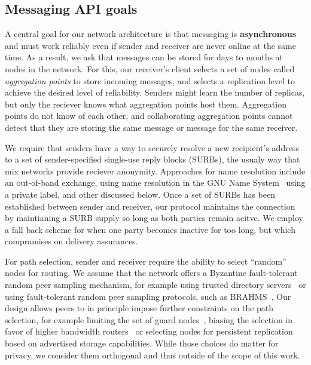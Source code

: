 \subsection{Messaging API goals} 

A central goal for our network architecture is that messaging is 
{\bf asynchronous} and must work reliably even if sender and receiver
are never online at the same time.  As a result, we ask that messages
can be stored for days to months at nodes in the network.  For this,
our receiver's client selects a set of nodes called {\em aggregation
points} to store incoming messages, and selects a replication level
to achieve the desired level of reliability.  Senders might learn the
number of replicas, but only the reciever knows what aggregation
points host them.  Aggregation points do not know of each other, and
collaborating aggregation points cannot detect that they are storing
the same message or message for the same receiver.

We require that senders have a way to securely resolve a new
recipient's address to a set of sender-specified single-use reply
blocks (SURBs), the usualy way that mix networks provide reciever
anonymity.  Approaches for name resolution include an out-of-band
exchange, using name resolution in the GNU Name System~\cite{gns}
using a private label, and other discussed below.  Once a set of
SURBs has been established between sender and receiver, our protocol
maintains the connection by maintianing a SURB supply so long as
both parties remain acitve.  We employ a fall back scheme for when
one party becomes inactive for too long, but which compramises on
delivery assurances.  %

For path selection, sender and receiver require the ability to select
``random'' nodes for routing.  We assume that the network offers a
Byzantine fault-tolerant random peer sampling mechanism, for example
using trusted directory servers~\cite{tordir} or using fault-tolerant
random peer sampling protocols, such as BRAHMS~\cite{brahms}.  Our
design allows peers to in principle impose further constraints on the
path selection, for example limiting the set of guard
nodes~\cite{oneguardisenough}, biasing the selection in favor of
higher bandwidth routers~\cite{findexample} or selecting nodes for
persistent replication based on advertised storage capabilities.
While those choices do matter for privacy, we consider them orthogonal
and thus outside of the scope of this work.


